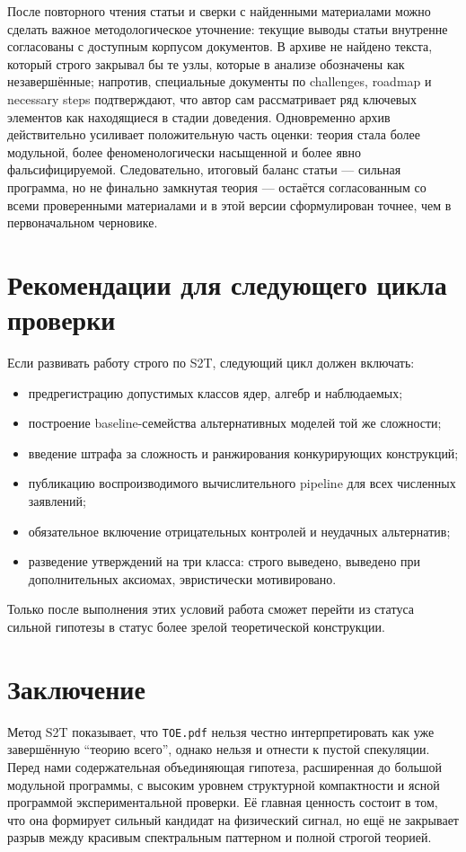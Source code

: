 \documentclass[12pt,a4paper]{article}
\begin{document}
После повторного чтения статьи и сверки с найденными материалами можно сделать важное методологическое уточнение: текущие выводы статьи внутренне согласованы с доступным корпусом документов. В архиве не найдено текста, который строго закрывал бы те узлы, которые в анализе обозначены как незавершённые; напротив, специальные документы по challenges, roadmap и necessary steps подтверждают, что автор сам рассматривает ряд ключевых элементов как находящиеся в стадии доведения. Одновременно архив действительно усиливает положительную часть оценки: теория стала более модульной, более феноменологически насыщенной и более явно фальсифицируемой. Следовательно, итоговый баланс статьи --- сильная программа, но не финально замкнутая теория --- остаётся согласованным со всеми проверенными материалами и в этой версии сформулирован точнее, чем в первоначальном черновике.

\section{Рекомендации для следующего цикла проверки}

Если развивать работу строго по S2T, следующий цикл должен включать:
\begin{itemize}
    \item предрегистрацию допустимых классов ядер, алгебр и наблюдаемых;
    \item построение baseline-семейства альтернативных моделей той же сложности;
    \item введение штрафа за сложность и ранжирования конкурирующих конструкций;
    \item публикацию воспроизводимого вычислительного pipeline для всех численных заявлений;
    \item обязательное включение отрицательных контролей и неудачных альтернатив;
    \item разведение утверждений на три класса: строго выведено, выведено при дополнительных аксиомах, эвристически мотивировано.
\end{itemize}

Только после выполнения этих условий работа сможет перейти из статуса сильной гипотезы в статус более зрелой теоретической конструкции.

\section{Заключение}

Метод S2T показывает, что \texttt{TOE.pdf} нельзя честно интерпретировать как уже завершённую ``теорию всего'', однако нельзя и отнести к пустой спекуляции. Перед нами содержательная объединяющая гипотеза, расширенная до большой модульной программы, с высоким уровнем структурной компактности и ясной программой экспериментальной проверки. Её главная ценность состоит в том, что она формирует сильный кандидат на физический сигнал, но ещё не закрывает разрыв между красивым спектральным паттерном и полной строгой теорией.
\end{document}
